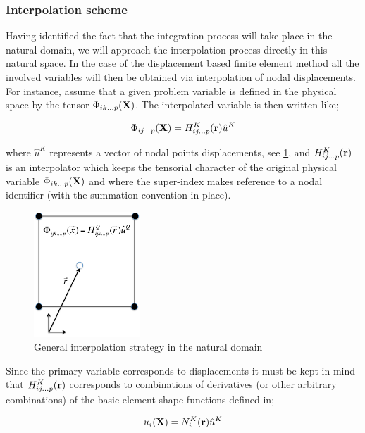 \subsubsection*{Interpolation scheme}
Having identified the fact that the integration process will take place in the natural domain, we will approach the interpolation process directly in this natural space. In the case of the displacement based finite element method all the involved variables will then be obtained via interpolation of nodal displacements. For instance, assume that a given problem variable is defined in the physical space by the tensor $\Phi_{ik...p}(\vb{X})$. The interpolated variable is then written like;

\begin{equation}
\Phi_{ij...p}(\vb{X})=H_{ij...p}^K(\vb{r})\hat{u}^K
\label{eq:interpol}
\end{equation}

where $\hat{u}^K$ represents a vector of nodal points displacements, see \cref{fig:interpol nat dom}, and $H_{ij...p}^K(\vb{r})$ is an interpolator which keeps the tensorial character of the original physical variable $\Phi_{ik...p}(\vb{X})$ and where the super-index makes reference to a nodal identifier (with the summation convention in place).


\begin{figure}[h]
\centering
\includegraphics[width=4cm]{figure2.pdf}
\caption{General interpolation strategy in the natural domain}
\label{fig:interpol nat dom}
\end{figure}
 


Since the primary variable corresponds to displacements it must be kept in mind that $H_{ij...p}^K(\vb{r})$ corresponds to combinations of derivatives (or other arbitrary combinations) of the basic element shape functions defined in;


\begin{equation}
u_i(\vb{X})=N_i^K(\vb{r})\hat{u}^K
\label{eq:el interpol}
\end{equation}



